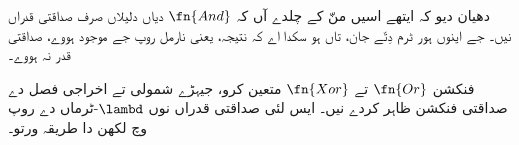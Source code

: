 \documentclass[../../../include/open-logic-section]{subfiles}
\begin{document}
دھیان دیو کہ ایتھے اسیں منّ کے چلدے آں کہ $\fn{And}$ دیاں
دلیلاں صرف صداقتی قدراں نیں۔ جے اینوں ہور ٹرم دِتّے جان،
تاں ہو سکدا اے کہ نتیجہ، یعنی نارمل روپ جے موجود ہووے، صداقتی
قدر نہ ہووے۔

\begin{prob}
  فنکشن $\fn{Or}$ تے $\fn{Xor}$ متعین کرو، جیہڑے شمولی تے
  اخراجی فصل دے صداقتی فنکشن ظاہر کردے نیں۔ ایس لئی صداقتی
  قدراں نوں $\lambd$-ٹرماں دے روپ وچ لکھن دا طریقہ ورتو۔
\end{prob}
\end{document}
